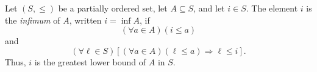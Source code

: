\begin{definition}[Infimum]
\label{def:infimum}
Let $(S,\leq)$ be a partially ordered set, let $A\subseteq S$, and let
$i\in S$. The element $i$ is the \emph{infimum} of $A$, written
$i=\inf A$, if
\[
  (\forall a\in A)(i\leq a)
\]
and
\[
  (\forall \ell\in S)
  \left[
    (\forall a\in A)(\ell\leq a)
    \Longrightarrow
    \ell\leq i
  \right].
\]
Thus, $i$ is the greatest lower bound of $A$ in $S$.
\end{definition}
